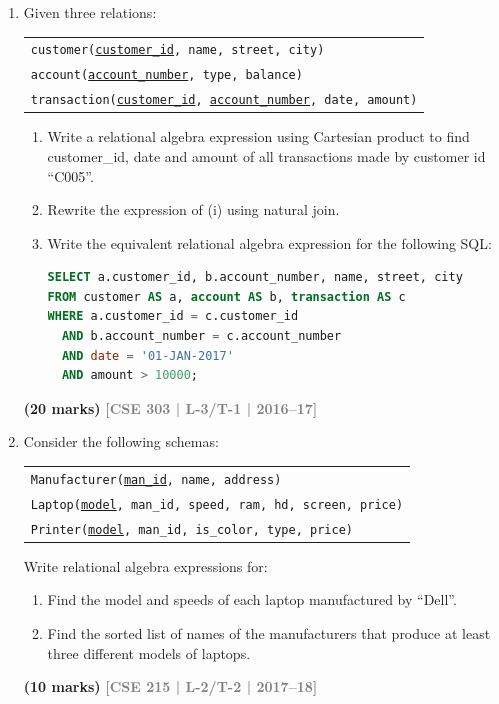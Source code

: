 \documentclass[12pt,a3paper]{article}
\newcommand{\yr}[1]{\hfill\textcolor{gray}{\small\textbf{[#1]}}}
\newcommand{\mk}[1]{\textcolor{orange!70!black}{\small\textbf{(#1 marks)}}}
\begin{document}
\begin{enumerate}
\item Given three relations:
\begin{center}
\begin{tabular}{l}
\texttt{customer(\underline{customer\_id}, name, street, city)}\\
\texttt{account(\underline{account\_number}, type, balance)}\\
\texttt{transaction(\underline{customer\_id}, \underline{account\_number}, date, amount)}
\end{tabular}
\end{center}
\begin{enumerate}
  \item Write a relational algebra expression using Cartesian product to find customer\_id, date and amount of all transactions made by customer id ``C005''.
  \item Rewrite the expression of (i) using natural join.
  \item Write the equivalent relational algebra expression for the following SQL:
\begin{lstlisting}[language=SQL]
SELECT a.customer_id, b.account_number, name, street, city
FROM customer AS a, account AS b, transaction AS c
WHERE a.customer_id = c.customer_id
  AND b.account_number = c.account_number
  AND date = '01-JAN-2017'
  AND amount > 10000;
\end{lstlisting}
\end{enumerate}
\mk{20} \yr{CSE 303 | L-3/T-1 | 2016--17}

\item Consider the following schemas:
\begin{center}
\begin{tabular}{l}
\texttt{Manufacturer(\underline{man\_id}, name, address)}\\
\texttt{Laptop(\underline{model}, man\_id, speed, ram, hd, screen, price)}\\
\texttt{Printer(\underline{model}, man\_id, is\_color, type, price)}
\end{tabular}
\end{center}
Write relational algebra expressions for:
\begin{enumerate}
  \item Find the model and speeds of each laptop manufactured by ``Dell''.
  \item Find the sorted list of names of the manufacturers that produce at least three different models of laptops.
\end{enumerate}
\mk{10} \yr{CSE 215 | L-2/T-2 | 2017--18}


\end{enumerate}
\end{document}
